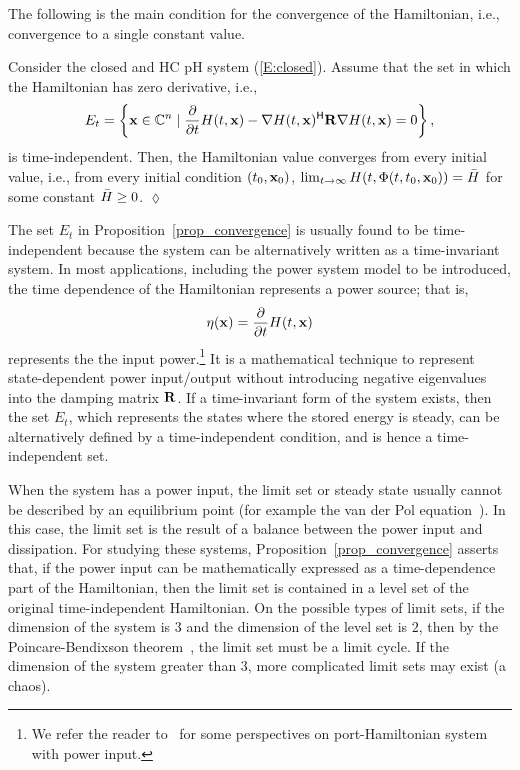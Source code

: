 The following is the main condition for the convergence of the Hamiltonian, i.e., convergence to a single constant value.

\begin{proposition} \label{prop_convergence}
Consider the closed and HC pH system (\ref{E:closed}). Assume that the set in which the Hamiltonian has zero derivative, i.e.,
\begin{equation*}
    E_t = \left\{ \mathbf{x} \in \mathbb{C}^n \mid \frac{\partial}{\partial t} H(t, \mathbf{x}) - \nabla H(t, \mathbf{x})^{\mathsf{H}} \mathbf{R} \nabla H(t, \mathbf{x}) = 0 \right\},
\end{equation*}
is time-independent.
Then, the Hamiltonian value converges from every initial value, i.e., from every initial condition $(t_0, \mathbf{x}_0)$, $\lim_{t\to \infty} H(t, \Phi(t, t_0, \mathbf{x}_0)) = \bar{H}$ for some constant $\bar{H} \geq 0$. \hfill $\lozenge$
\end{proposition}

The set $E_t$ in Proposition~\ref{prop_convergence} is usually found to be time-independent because the system can be alternatively written as a time-invariant system. In most applications, including the power system model to be introduced, the time dependence of the Hamiltonian represents a power source; that is,
\begin{equation*}
    \eta(\mathbf{x}) = \frac{\partial}{\partial t} H(t, \mathbf{x})
\end{equation*}
represents the the input power.\footnote{We refer the reader to~\cite{krhavc2024port,monshizadeh2019power} for some perspectives on port-Hamiltonian system with power input.} It is a mathematical technique to represent state-dependent power input/output without introducing negative eigenvalues into the damping matrix $\mathbf{R}$. If a time-invariant form of the system exists, then the set $E_t$, which represents the states where the stored energy is steady, can be alternatively defined by a time-independent condition, and is hence a time-independent set.

When the system has a power input, the limit set or steady state usually cannot be described by an equilibrium point (for example the van der Pol equation~\cite{Khalil:1173048}). In this case, the limit set is the result of a balance between the power input and dissipation. For studying these systems, Proposition~\ref{prop_convergence} asserts that, if the power input can be mathematically expressed as a time-dependence part of the Hamiltonian, then the limit set is contained in a level set of the original time-independent Hamiltonian. 
On the possible types of limit sets,
if the dimension of the system is $3$ and the dimension of the level set is $2$, then by the Poincare-Bendixson theorem~\cite{Khalil:1173048}, the limit set must be a limit cycle. If the dimension of the system greater than $3$, more complicated limit sets may exist (a chaos).


